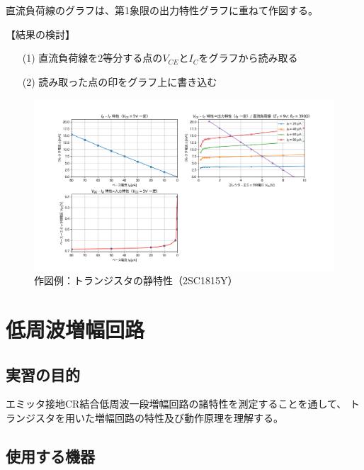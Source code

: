 \documentclass[uplatex,a4paper,11pt,oneside,openany]{jsbook}
\begin{document}
\vfill

直流負荷線のグラフは、第1象限の出力特性グラフに重ねて作図する。

\vfill

【結果の検討】

\begin{enumerate}
\item[(1)] 直流負荷線を2等分する点の$V_{CE}$と$I_C$をグラフから読み取る\\
\item[(2)] 読み取った点の印をグラフ上に書き込む
\end{enumerate}

\vfill
\newpage

\begin{figure}[H]
  \centering
   \includegraphics[keepaspectratio, scale=0.65, angle=90]
               {figs/png/staticExample.png}
               \caption{作図例：トランジスタの静特性（2SC1815Y）}
               \label{fig:staticexample}
\end{figure}

\newpage

\chapter{低周波増幅回路}

\section{実習の目的}

エミッタ接地CR結合低周波一段増幅回路の諸特性を測定することを通して、
トランジスタを用いた増幅回路の特性及び動作原理を理解する。

\section{使用する機器}
\end{document}
